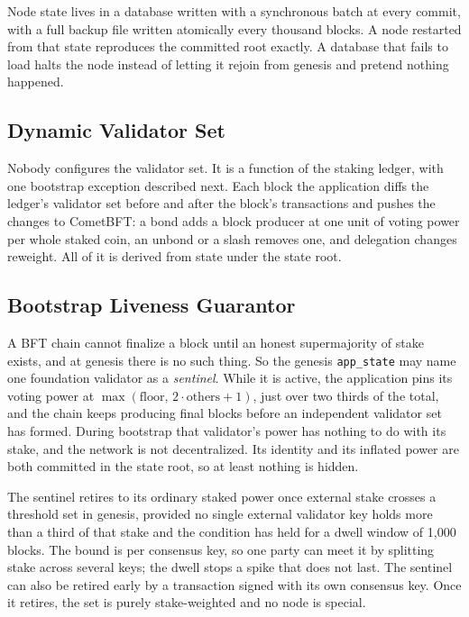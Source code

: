 \documentclass[twocolumn,10pt]{article}
\begin{document}
Node state lives in a database written with a synchronous batch at every commit, with a full backup file written atomically every thousand blocks. A node restarted from that state reproduces the committed root exactly. A database that fails to load halts the node instead of letting it rejoin from genesis and pretend nothing happened.

\subsection{Dynamic Validator Set}

Nobody configures the validator set. It is a function of the staking ledger, with one bootstrap exception described next. Each block the application diffs the ledger's validator set before and after the block's transactions and pushes the changes to CometBFT: a bond adds a block producer at one unit of voting power per whole staked coin, an unbond or a slash removes one, and delegation changes reweight. All of it is derived from state under the state root.

\subsection{Bootstrap Liveness Guarantor}
\label{sec:sentinel}

A BFT chain cannot finalize a block until an honest supermajority of stake exists, and at genesis there is no such thing. So the genesis \texttt{app\_state} may name one foundation validator as a \emph{sentinel}. While it is active, the application pins its voting power at $\max(\mathrm{floor},\,2\cdot\mathrm{others}+1)$, just over two thirds of the total, and the chain keeps producing final blocks before an independent validator set has formed. During bootstrap that validator's power has nothing to do with its stake, and the network is not decentralized. Its identity and its inflated power are both committed in the state root, so at least nothing is hidden.

The sentinel retires to its ordinary staked power once external stake crosses a threshold set in genesis, provided no single external validator key holds more than a third of that stake and the condition has held for a dwell window of 1,000 blocks. The bound is per consensus key, so one party can meet it by splitting stake across several keys; the dwell stops a spike that does not last. The sentinel can also be retired early by a transaction signed with its own consensus key. Once it retires, the set is purely stake-weighted and no node is special.
\end{document}
